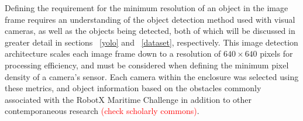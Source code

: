\documentclass{erauthesis}
\begin{document}
Defining the requirement for the minimum resolution of an object in the image frame requires an understanding of the object detection method used with visual cameras, as well as the objects being detected, both of which will be discussed in greater detail in sections ~\ref{yolo} and ~\ref{dataset}, respectively.
This image detection architecture scales each image frame down to a resolution of $640 \times 640$ pixels for processing efficiency, and must be considered when defining the minimum pixel density of a camera's sensor.
Each camera within the enclosure was selected using these metrics, and object information based on the obstacles commonly associated with the RobotX Maritime Challenge in addition to other contemporaneous research \cite{thompson2023} \textcolor{red}{(check scholarly commons)}.


\end{document}
